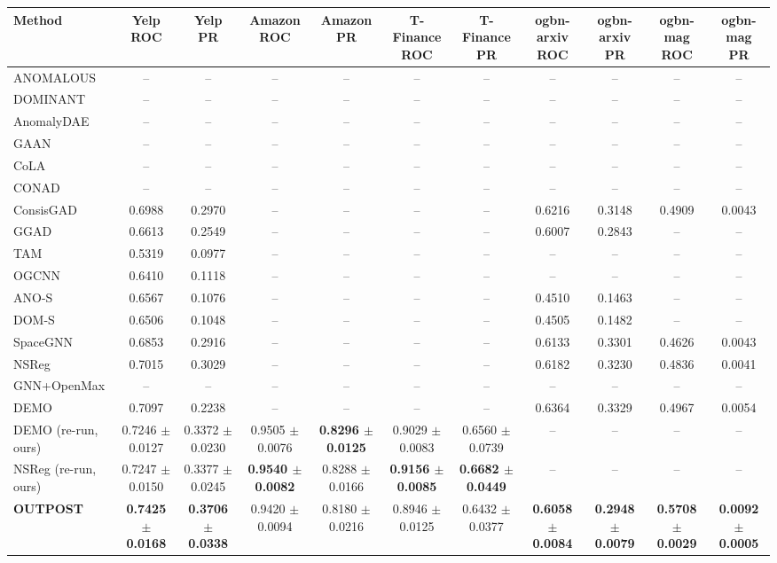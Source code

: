 \begin{table}[t]
\centering
\small
\begin{tabular}{lcccccccccc}
\toprule
Method & Yelp ROC & Yelp PR & Amazon ROC & Amazon PR & T-Finance ROC & T-Finance PR & ogbn-arxiv ROC & ogbn-arxiv PR & ogbn-mag ROC & ogbn-mag PR \\
\midrule
ANOMALOUS & -- & -- & -- & -- & -- & -- & -- & -- & -- & -- \\
DOMINANT & -- & -- & -- & -- & -- & -- & -- & -- & -- & -- \\
AnomalyDAE & -- & -- & -- & -- & -- & -- & -- & -- & -- & -- \\
GAAN & -- & -- & -- & -- & -- & -- & -- & -- & -- & -- \\
CoLA & -- & -- & -- & -- & -- & -- & -- & -- & -- & -- \\
CONAD & -- & -- & -- & -- & -- & -- & -- & -- & -- & -- \\
ConsisGAD & 0.6988 & 0.2970 & -- & -- & -- & -- & 0.6216 & 0.3148 & 0.4909 & 0.0043 \\
GGAD & 0.6613 & 0.2549 & -- & -- & -- & -- & 0.6007 & 0.2843 & -- & -- \\
TAM & 0.5319 & 0.0977 & -- & -- & -- & -- & -- & -- & -- & -- \\
OGCNN & 0.6410 & 0.1118 & -- & -- & -- & -- & -- & -- & -- & -- \\
ANO-S & 0.6567 & 0.1076 & -- & -- & -- & -- & 0.4510 & 0.1463 & -- & -- \\
DOM-S & 0.6506 & 0.1048 & -- & -- & -- & -- & 0.4505 & 0.1482 & -- & -- \\
SpaceGNN & 0.6853 & 0.2916 & -- & -- & -- & -- & 0.6133 & 0.3301 & 0.4626 & 0.0043 \\
NSReg & 0.7015 & 0.3029 & -- & -- & -- & -- & 0.6182 & 0.3230 & 0.4836 & 0.0041 \\
GNN+OpenMax & -- & -- & -- & -- & -- & -- & -- & -- & -- & -- \\
DEMO & 0.7097 & 0.2238 & -- & -- & -- & -- & 0.6364 & 0.3329 & 0.4967 & 0.0054 \\
DEMO (re-run, ours) & 0.7246 $\pm$ 0.0127 & 0.3372 $\pm$ 0.0230 & 0.9505 $\pm$ 0.0076 & \textbf{0.8296 $\pm$ 0.0125} & 0.9029 $\pm$ 0.0083 & 0.6560 $\pm$ 0.0739 & -- & -- & -- & -- \\
NSReg (re-run, ours) & 0.7247 $\pm$ 0.0150 & 0.3377 $\pm$ 0.0245 & \textbf{0.9540 $\pm$ 0.0082} & 0.8288 $\pm$ 0.0166 & \textbf{0.9156 $\pm$ 0.0085} & \textbf{0.6682 $\pm$ 0.0449} & -- & -- & -- & -- \\
\midrule
\textbf{OUTPOST} & \textbf{0.7425 $\pm$ 0.0168} & \textbf{0.3706 $\pm$ 0.0338} & 0.9420 $\pm$ 0.0094 & 0.8180 $\pm$ 0.0216 & 0.8946 $\pm$ 0.0125 & 0.6432 $\pm$ 0.0377 & \textbf{0.6058 $\pm$ 0.0084} & \textbf{0.2948 $\pm$ 0.0079} & \textbf{0.5708 $\pm$ 0.0029} & \textbf{0.0092 $\pm$ 0.0005} \\

\end{tabular}
\end{table}
